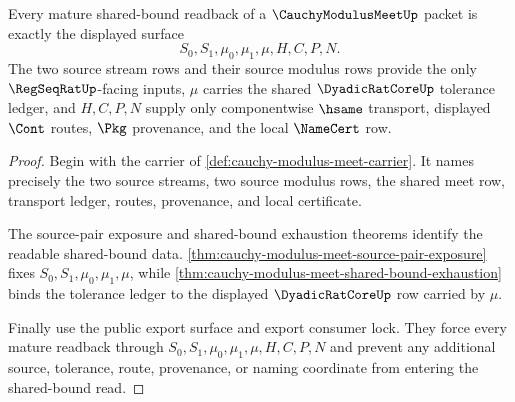 \begin{theorem}
\label{thm:cauchy-modulus-meet-mature-shared-bound-readback}
Every mature shared-bound readback of a $\CauchyModulusMeetUp$ packet is exactly the displayed surface
$$
S_0,S_1,\mu_0,\mu_1,\mu,H,C,P,N.
$$
The two source stream rows and their source modulus rows provide the only $\RegSeqRatUp$-facing inputs, $\mu$ carries the shared $\DyadicRatCoreUp$ tolerance ledger, and $H,C,P,N$ supply only componentwise $\hsame$ transport, displayed $\Cont$ routes, $\Pkg$ provenance, and the local $\NameCert$ row.
\end{theorem}
\begin{proof}
Begin with the carrier of \autoref{def:cauchy-modulus-meet-carrier}. It names precisely the two source streams, two source modulus rows, the shared meet row, transport ledger, routes, provenance, and local certificate.

The source-pair exposure and shared-bound exhaustion theorems identify the readable shared-bound data. \autoref{thm:cauchy-modulus-meet-source-pair-exposure} fixes $S_0,S_1,\mu_0,\mu_1,\mu$, while \autoref{thm:cauchy-modulus-meet-shared-bound-exhaustion} binds the tolerance ledger to the displayed $\DyadicRatCoreUp$ row carried by $\mu$.

Finally use the public export surface and export consumer lock. They force every mature readback through $S_0,S_1,\mu_0,\mu_1,\mu,H,C,P,N$ and prevent any additional source, tolerance, route, provenance, or naming coordinate from entering the shared-bound read.
\end{proof}

